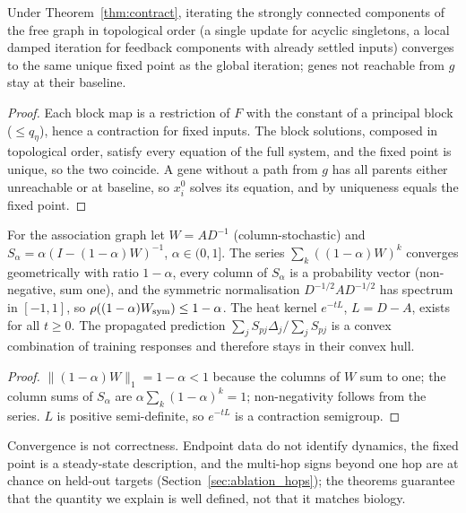 \begin{proposition}\label{prop:scc}
Under Theorem~\ref{thm:contract}, iterating the strongly connected components of the free graph in topological order (a single update for acyclic singletons, a local damped iteration for feedback components with already settled inputs) converges to the same unique fixed point as the global iteration; genes not reachable from $g$ stay at their baseline.
\end{proposition}
\begin{proof}
Each block map is a restriction of $F$ with the constant of a principal block ($\le q_\eta$), hence a contraction for fixed inputs. The block solutions, composed in topological order, satisfy every equation of the full system, and the fixed point is unique, so the two coincide. A gene without a path from $g$ has all parents either unreachable or at baseline, so $x^0_i$ solves its equation, and by uniqueness equals the fixed point.
\end{proof}

\begin{proposition}\label{prop:kernel}
For the association graph let $W=AD^{-1}$ (column-stochastic) and $S_\alpha=\alpha(I-(1-\alpha)W)^{-1}$, $\alpha\in(0,1]$. The series $\sum_k((1-\alpha)W)^k$ converges geometrically with ratio $1-\alpha$, every column of $S_\alpha$ is a probability vector (non-negative, sum one), and the symmetric normalisation $D^{-1/2}AD^{-1/2}$ has spectrum in $[-1,1]$, so $\rho((1-\alpha)W_{\rm sym})\le1-\alpha$. The heat kernel $e^{-tL}$, $L=D-A$, exists for all $t\ge0$. The propagated prediction $\sum_jS_{pj}\Delta_j/\sum_jS_{pj}$ is a convex combination of training responses and therefore stays in their convex hull.
\end{proposition}
\begin{proof}
$\|(1-\alpha)W\|_1=1-\alpha<1$ because the columns of $W$ sum to one; the column sums of $S_\alpha$ are $\alpha\sum_k(1-\alpha)^k=1$; non-negativity follows from the series. $L$ is positive semi-definite, so $e^{-tL}$ is a contraction semigroup.
\end{proof}

\begin{remark}\label{rem:notclaimed}
Convergence is not correctness. Endpoint data do not identify dynamics, the fixed point is a steady-state description, and the multi-hop signs beyond one hop are at chance on held-out targets (Section~\ref{sec:ablation_hops}); the theorems guarantee that the quantity we explain is well defined, not that it matches biology.
\end{remark}

